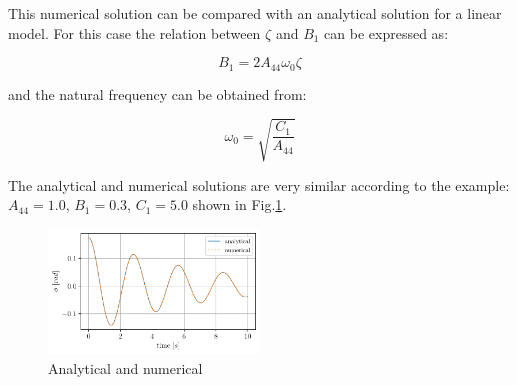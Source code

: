     

    This numerical solution can be compared with an analytical solution for
a linear model.  For this case the relation between $\zeta$ and $B_1$ can
be expressed as:
 
            
    
    \begin{equation}
B_{1} = 2 A_{44} \omega_{0} \zeta
\label{eq:B_1_zeta_eq}
\end{equation}

    

    and the natural frequency can be obtained from:
 
            
    
    \begin{equation}
\omega_{0} = \sqrt{\frac{C_{1}}{A_{44}}}
\label{eq:omega0_eq}
\end{equation}

    

    The analytical and numerical solutions are very similar according to the
example: $A_{44} = 1.0$, $B_1 = 0.3$, $C_1 = 5.0$ shown in
Fig.\ref{fig:analytical_numerical}.

    

    \begin{figure}[H]
        \begin{center}\includegraphics[width = 0.5\textwidth]{figures/analytical_numerical.pdf}\end{center}
        \vspace{-1cm}
        \caption{Analytical and numerical}
        \label{fig:analytical_numerical}
    \end{figure}
    
    